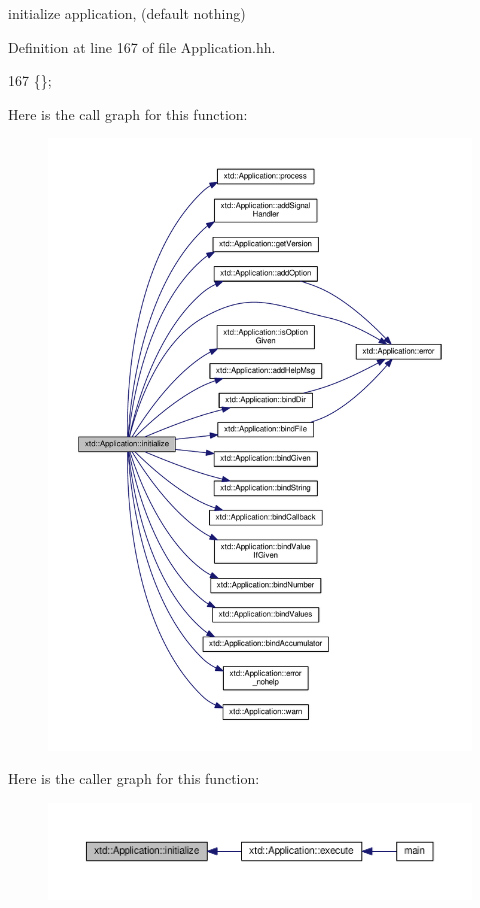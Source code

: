 initialize application, (default nothing) 



Definition at line 167 of file Application.\+hh.


\begin{DoxyCode}
167 \{\};
\end{DoxyCode}


Here is the call graph for this function\+:
\nopagebreak
\begin{figure}[H]
\begin{center}
\leavevmode
\includegraphics[width=350pt]{classxtd_1_1Application_ab8e835ba678494c42e12c4613958d18a_cgraph}
\end{center}
\end{figure}




Here is the caller graph for this function\+:
\nopagebreak
\begin{figure}[H]
\begin{center}
\leavevmode
\includegraphics[width=350pt]{classxtd_1_1Application_ab8e835ba678494c42e12c4613958d18a_icgraph}
\end{center}
\end{figure}


